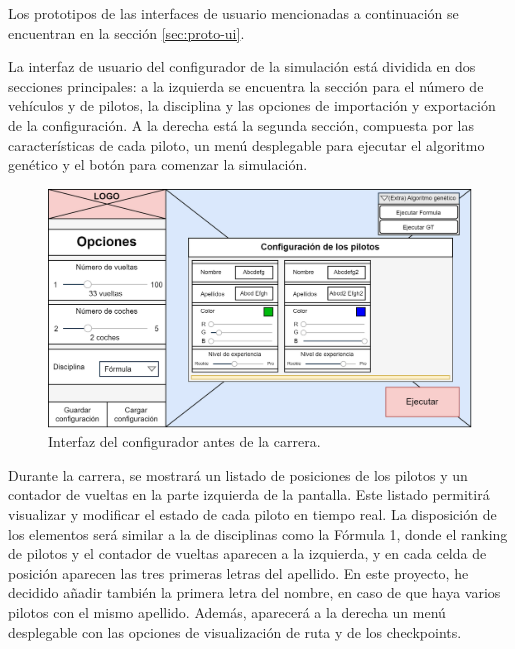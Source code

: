 Los prototipos de las interfaces de usuario mencionadas a continuación se encuentran en la sección \ref{sec:proto-ui}.

\bigskip

La interfaz de usuario del configurador de la simulación está dividida en dos secciones principales: a la izquierda se encuentra la sección para el número de vehículos y de pilotos, la disciplina y las opciones de importación y exportación de la configuración. A la derecha está la segunda sección, compuesta por las características de cada piloto, un menú desplegable para ejecutar el algoritmo genético y el botón para comenzar la simulación.

\begin{figure}[H]
    \centering
    \includegraphics[width=\textwidth]{imagenes/pag1.png}
    \caption{Interfaz del configurador antes de la carrera.}
\end{figure}

Durante la carrera, se mostrará un listado de posiciones de los pilotos y un contador de vueltas en la parte izquierda de la pantalla. Este listado permitirá visualizar y modificar el estado de cada piloto en tiempo real. La disposición de los elementos será similar a la de disciplinas como la Fórmula 1, donde el ranking de pilotos y el contador de vueltas aparecen a la izquierda, y en cada celda de posición aparecen las tres primeras letras del apellido. En este proyecto, he decidido añadir también la primera letra del nombre, en caso de que haya varios pilotos con el mismo apellido. Además, aparecerá a la derecha un menú desplegable con las opciones de visualización de ruta y de los checkpoints.


